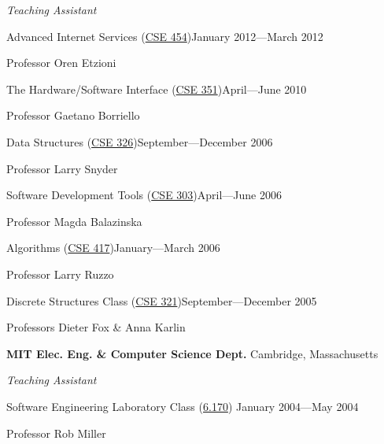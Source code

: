 \documentclass[letter]{article}
\begin{document}
\vspace{0.5\baselineskip}
\par
{\em Teaching Assistant}

\vspace{0.5\baselineskip}
\par
Advanced Internet Services (\href{http://www.cs.washington.edu/education/courses/454/12wi/}{CSE 454})\hfill January 2012---March 2012
\par
Professor Oren Etzioni

\vspace{0.5\baselineskip}
\par
The Hardware/Software Interface (\href{http://www.cs.washington.edu/education/courses/351/10sp/}{CSE 351})\hfill April---June 2010
\par
Professor Gaetano Borriello

\vspace{0.5\baselineskip}
\par
Data Structures (\href{http://www.cs.washington.edu/education/courses/326/06au/}{CSE 326})\hfill September---December 2006
\par
Professor Larry Snyder

\vspace{0.5\baselineskip}
\par
Software Development Tools (\href{http://www.cs.washington.edu/education/courses/303/06sp/}{CSE 303})\hfill April---June 2006
\par
Professor Magda Balazinska

\vspace{0.5\baselineskip}
\par
Algorithms (\href{http://www.cs.washington.edu/education/courses/417/06wi/}{CSE 417})\hfill January---March 2006
\par
Professor Larry Ruzzo

\vspace{0.5\baselineskip}
\par
Discrete Structures Class (\href{http://www.cs.washington.edu/education/courses/321/05au/}{CSE 321})\hfill September---December 2005
\par
Professors Dieter Fox \& Anna Karlin
\par

\vspace{0.5\baselineskip}
\par
{\bf MIT Elec. Eng. \& Computer Science Dept.} \hfill Cambridge, Massachusetts

\vspace{0.5\baselineskip}
\par
{\em Teaching Assistant}
\par
Software Engineering Laboratory Class (\href{http://courses.csail.mit.edu/6.170/old-www/2004-Spring/admin-info/generalinfo.html#Staff}{6.170}) \hfill January 2004---May 2004
\par
Professor Rob Miller
\end{document}
